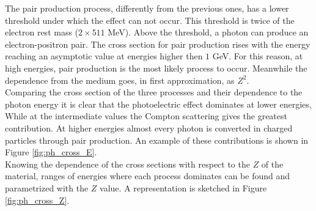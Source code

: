 The pair production process, differently from the previous ones, has a lower threshold under which the effect can not occur. This threshold is twice of the electron rest mass ($2\times 511$ MeV). Above the threshold, a photon can produce an electron-positron pair.
The cross section for pair production rises with the energy reaching an asymptotic value at energies higher then $1$ GeV. For this reason, at high energies, pair production is the most likely process to occur. Meanwhile the dependence from the medium goes, in first approximation, as $Z^2$.\\

Comparing the cross section of the three processes and their dependence to the photon energy it is clear that the photoelectric effect dominates at lower energies, While at the intermediate values the Compton scattering gives the greatest contribution.
At higher energies almost every photon is converted in charged particles through pair production. An example of these contributions is shown in Figure \ref{fig:ph_cross_E}.\\
Knowing the dependence of the cross sections with respect to the $Z$ of the material, ranges of energies where each process dominates can be found and parametrized with the $Z$ value. A representation is sketched in Figure \ref{fig:ph_cross_Z}.

